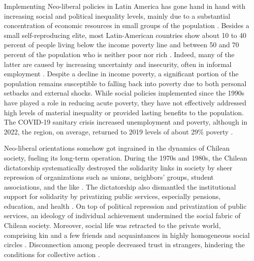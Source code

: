 Implementing Neo-liberal policies in Latin America has gone hand in hand with increasing social and political inequality levels, mainly due to a substantial concentration of economic resources in small groups of the population \parencite{sassen_expulsiones_2015}. Besides a small self-reproducing elite, most Latin-American countries show about 10 to 40 percent of people living below the income poverty line and between 50 and 70 percent of the population who is neither poor nor rich \parencite{lopez-calva_macroeconomiy_2004}. Indeed, many of the latter are caused by increasing uncertainty and insecurity, often in informal employment \parencite{lomnitz_lo_2008, portes_free-market_2005, schneider_economic_2008}. Despite a decline in income poverty, a significant portion of the population remains susceptible to falling back into poverty due to both personal setbacks and external shocks. While social policies implemented since the 1990s have played a role in reducing acute poverty, they have not effectively addressed high levels of material inequality or provided lasting benefits to the population. The COVID-19 sanitary crisis increased unemployment and poverty, although in 2022, the region, on average, returned to 2019 levels of about 29\% poverty \parencite{cepal_panorama_2023}.
\bigskip

Neo-liberal orientations somehow got ingrained in the dynamics of Chilean society, fueling its long-term operation. During the 1970s and 1980s, the Chilean dictatorship systematically destroyed the solidarity links in society by sheer repression of organizations such as unions, neighbors' groups, student associations, and the like \parencite{espinoza_local_2013}. The dictatorship also dismantled the institutional support for solidarity by privatizing public services, especially pensions, education, and health \parencite{espinoza_contention_2018}. On top of political repression and privatization of public services, an ideology of individual achievement undermined the social fabric of Chilean society. Moreover, social life was retracted to the private world, comprising kin and a few friends and acquaintances in highly homogeneous social circles \parencite{espinoza_citizens_2009}. Disconnection among people decreased trust in strangers, hindering the conditions for collective action \parencite{lechner_desafios_2000}.
\bigskip

